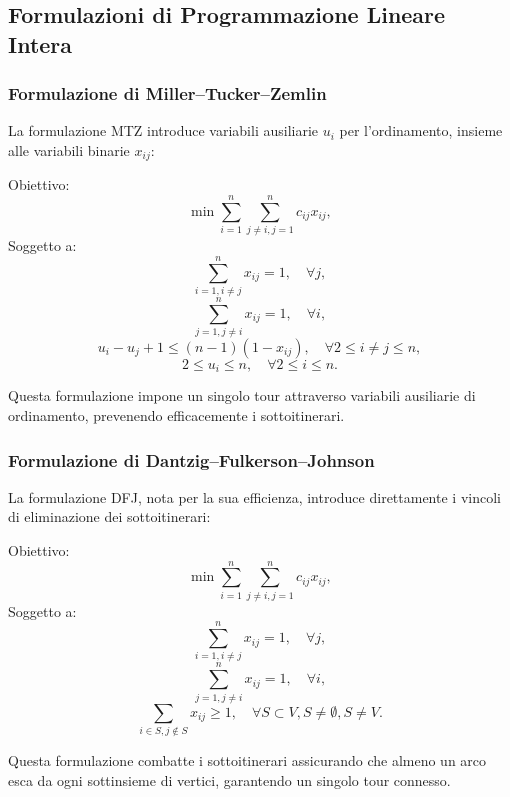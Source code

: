 \subsection{Formulazioni di Programmazione Lineare Intera}

\subsubsection{Formulazione di Miller–Tucker–Zemlin}

La formulazione \gls{MTZ} introduce variabili ausiliarie \(u_i\) per l'ordinamento, insieme alle variabili binarie \(x_{ij}\):

Obiettivo:
\[
	\min \sum_{i=1}^{n} \sum_{j \ne i, j=1}^{n} c_{ij} x_{ij},
\]
Soggetto a:
\[
	\sum_{i=1, i \ne j}^{n} x_{ij} = 1, \quad \forall j,
\]
\[
	\sum_{j=1, j \ne i}^{n} x_{ij} = 1, \quad \forall i,
\]
\[
	u_i - u_j + 1 \le (n-1)(1 - x_{ij}), \quad \forall 2 \le i \ne j \le n,
\]
\[
	2 \le u_i \le n, \quad \forall 2 \le i \le n.
\]

Questa formulazione impone un singolo tour attraverso variabili ausiliarie di ordinamento, prevenendo efficacemente i sottoitinerari.

\subsubsection{Formulazione di Dantzig–Fulkerson–Johnson}

La formulazione DFJ, nota per la sua efficienza, introduce direttamente i vincoli di eliminazione dei sottoitinerari:

Obiettivo:
\[
	\min \sum_{i=1}^{n} \sum_{j \ne i, j=1}^{n} c_{ij} x_{ij},
\]
Soggetto a:
\[
	\sum_{i=1, i \ne j}^{n} x_{ij} = 1, \quad \forall j,
\]
\[
	\sum_{j=1, j \ne i}^{n} x_{ij} = 1, \quad \forall i,
\]
\[
	\sum_{i \in S, j \notin S} x_{ij} \ge 1, \quad \forall S \subset V, S \ne \emptyset, S \ne V.
\]


Questa formulazione combatte i sottoitinerari assicurando che almeno un arco esca da ogni sottinsieme di vertici, garantendo un singolo tour connesso.


